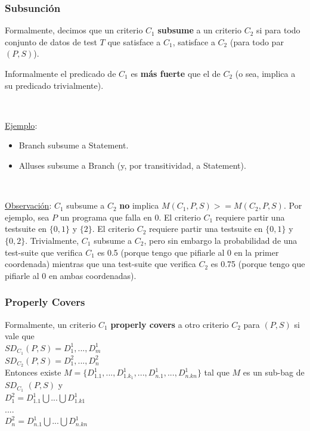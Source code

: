 \documentclass[]{article}
\begin{document}
\subsubsection{Subsunción}
Formalmente, decimos que un criterio $C_1$ \textbf{subsume} a un criterio $C_2$ si para todo conjunto de datos de test $T$ que satisface a $C_1$, satisface a $C_2$ (para todo par $(P,S)$).

Informalmente el predicado de $C_1$ es \textbf{más fuerte} que el de $C_2$ (o sea, implica a su predicado trivialmente).

~\newline

\underline{Ejemplo}:
\begin{itemize}
	\item Branch subsume a Statement.
	\item Alluses subsume a Branch (y, por transitividad, a Statement).
\end{itemize}

~\newline

\underline{Observación}: $C_1$ subsume a $C_2$ \textbf{no} implica $M(C_1, P, S) >= M (C_2, P,S)$. Por ejemplo, sea $P$ un programa que falla en 0. El criterio $C_1$ requiere partir una testsuite en $\{0,1\}$ y $\{2\}$. El criterio $C_2$ requiere partir una testsuite en $\{0,1\}$ y $\{0,2\}$. Trivialmente, $C_1$ subsume a $C_2$, pero sin embargo la probabilidad de una test-suite que verifica $C_1$ es 0.5 (porque tengo que pifiarle al 0 en la primer coordenada) mientras que una test-suite que verifica $C_2$ es 0.75 (porque tengo que pifiarle al 0 en ambas coordenadas).

\subsubsection{Properly Covers}
Formalmente, un criterio $C_1$ \textbf{properly covers} a otro criterio $C_2$ para $(P,S)$ si vale que\\
$SD_{C_1} (P,S) = {D_1^1,..., D_m^1}$\\
$SD_{C_2} (P,S) = {D_1^2,..., D_n^2}$\\

Entonces existe $M = \{D_{1.1}^1,..., D_{1.k_1}^1 ,...,D_{n.1}^1,..., D_{n.kn}^1\}$ tal que $M$ es un sub-bag de $SD_{C_1}$ $(P,S)$ y\\
$D_1^2 = D_{1.1}^1 \bigcup ... \bigcup D_{1.k1}^1$\\
....\\
$D_n^2 = D_{n.1}^1 \bigcup ... \bigcup D_{n.kn}^1$
\end{document}
